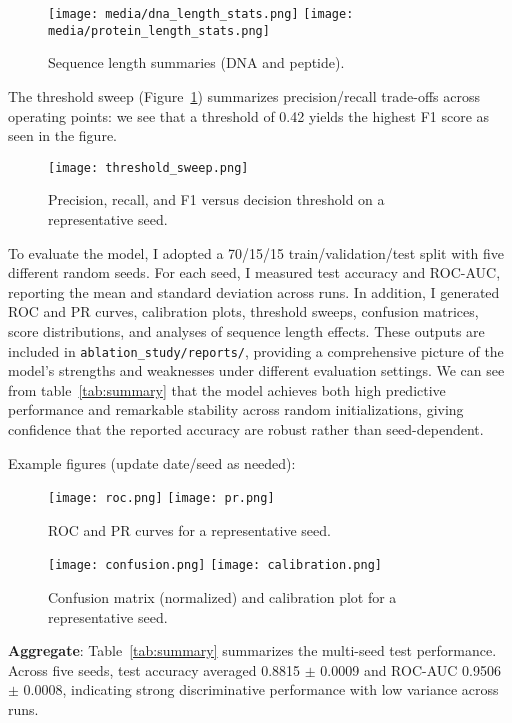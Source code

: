 \documentclass{article}
\begin{document}
\begin{figure}[H]
  \centering
  \texttt{[image: media/dna\_length\_stats.png]}
  \texttt{[image: media/protein\_length\_stats.png]}
  \caption{Sequence length summaries (DNA and peptide).}
\end{figure}

\noindent The threshold sweep (Figure~\ref{fig:thresh}) summarizes precision/recall trade-offs across operating points: we see that a threshold of 0.42 yields the highest F1 score as seen in the figure.

\begin{figure}[H]
  \centering
  \texttt{[image: threshold\_sweep.png]}
  \caption{Precision, recall, and F1 versus decision threshold on a representative seed.}
  \label{fig:thresh}
\end{figure}

To evaluate the model, I adopted a 70/15/15 train/validation/test split with five different random seeds. For each seed, I measured test accuracy and ROC-AUC, reporting the mean and standard deviation across runs. In addition, I generated ROC and PR curves, calibration plots, threshold sweeps, confusion matrices, score distributions, and analyses of sequence length effects. These outputs are included in \texttt{ablation\_study/reports/}, providing a comprehensive picture of the model’s strengths and weaknesses under different evaluation settings. We can see from table~\ref{tab:summary} that the model achieves both high predictive performance and remarkable stability across random initializations, giving confidence that the reported accuracy are robust rather than seed-dependent.

\noindent Example figures (update date/seed as needed):
\begin{figure}[H]
  \centering
  \texttt{[image: roc.png]}
  \texttt{[image: pr.png]}
  \caption{ROC and PR curves for a representative seed.}
\end{figure}

\begin{figure}[H]
  \centering
  \texttt{[image: confusion.png]}
  \texttt{[image: calibration.png]}
  \caption{Confusion matrix (normalized) and calibration plot for a representative seed.}
\end{figure}

\noindent \textbf{Aggregate}: Table~\ref{tab:summary} summarizes the multi-seed test performance. Across five seeds, test accuracy averaged 0.8815 $\pm$ 0.0009 and ROC-AUC 0.9506 $\pm$ 0.0008, indicating strong discriminative performance with low variance across runs.
\end{document}
